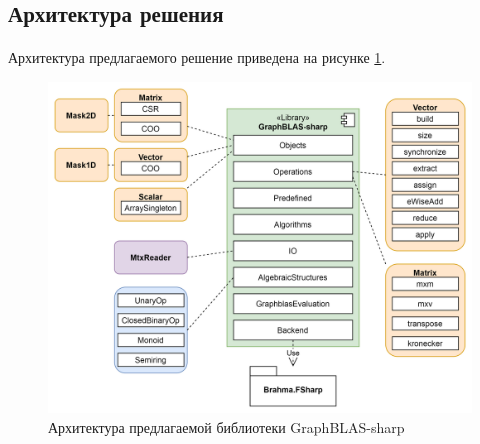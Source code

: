 \subsection{Архитектура решения}
\paragraph{}

Архитектура предлагаемого решение приведена на рисунке \ref{fig:arch}.
\begin{figure}[h!]
\centering
\includegraphics[scale=0.5]{pictures/dia3.png}
\caption{Архитектура предлагаемой библиотеки GraphBLAS-sharp}
\label{fig:arch}
\end{figure}

